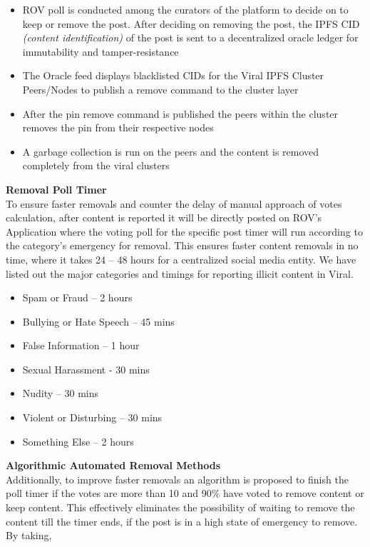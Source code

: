 \documentclass[10pt]{article}
\begin{document}
\begin{itemize}[leftmargin = +0.2in]
\item ROV poll is conducted among the curators of the platform to decide on to keep or remove the post.  After deciding on removing the post,  the IPFS CID \textit{(content identification)} of the post is sent to a decentralized oracle ledger for immutability and tamper-resistance
\item The Oracle feed displays blacklisted CIDs for the Viral IPFS Cluster Peers/Nodes to publish a remove command to the cluster layer
\item After the pin remove command is published the peers within the cluster removes the pin from their respective nodes
\item A garbage collection is run on the peers and the content is removed completely from the viral clusters
\end{itemize}



\textbf{Removal Poll Timer}\\

To ensure faster removals and counter the delay of manual approach of votes calculation, after content is reported it will be directly posted on ROV’s Application where the voting poll for the specific post timer will run according to the category’s emergency for removal. This ensures faster content removals in no time, where it takes 24 – 48 hours for a centralized social media entity. We have listed out the major categories and timings for reporting illicit content in Viral.

\begin{itemize}[leftmargin=+0.2in]
\item Spam or Fraud – 2 hours
\item Bullying or Hate Speech – 45 mins
\item False Information – 1 hour
\item Sexual Harassment - 30 mins
\item Nudity – 30 mins
\item Violent or Disturbing – 30 mins
\item Something Else – 2 hours
\end{itemize}

\textbf{Algorithmic Automated Removal Methods}\\

Additionally, to improve faster removals an algorithm is proposed to finish the poll timer if the votes are more than 10 and 90\% have voted to remove content or keep content. This effectively eliminates the possibility of waiting to remove the content till the timer ends, if the post is in a high state of emergency to remove. By taking,
\end{document}
